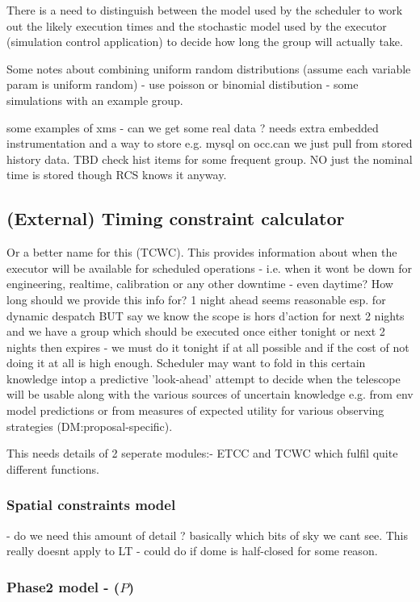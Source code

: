There is a need to distinguish between the model used by the scheduler to work out the likely execution times and the stochastic model used by the executor (simulation control application) to decide how long the group will actually take. 

Some notes about combining uniform random distributions (assume each variable param is uniform random) - use poisson or binomial distibution - some simulations with an example group.

some examples of xms - can we get some real data ? needs extra embedded instrumentation and a way to store e.g. mysql on occ.can we just pull from stored history data. TBD check hist items for some frequent group. NO just the nominal time is stored though RCS knows it anyway.


\subsection{(External) Timing constraint calculator } 
Or a better name for this (TCWC). This provides information about when the executor will be available for scheduled operations - i.e. when it wont be down for engineering, realtime, calibration or any other downtime - even daytime?
How long should we provide this info for?
1 night ahead seems reasonable esp. for dynamic despatch BUT say we know the scope is hors d'action for next 2 nights and we have a group which should be executed once either tonight or next 2 nights then expires - we must do it tonight if at all possible and if the cost of not doing it at all is high enough. Scheduler may want to fold in this certain knowledge intop a predictive 'look-ahead' attempt to decide when the telescope will be usable along with the various sources of uncertain knowledge e.g. from env model predictions or from measures of expected utility for various observing strategies (DM:proposal-specific).

This needs details of 2 seperate modules:- ETCC and TCWC which fulfil quite different functions.


\subsubsection{Spatial constraints model} 
- do we need this amount of detail ? basically which bits of sky we cant see. This really doesnt apply to LT - could do if dome is half-closed for some reason.

\subsubsection{Phase2 model - ($P$)} 

